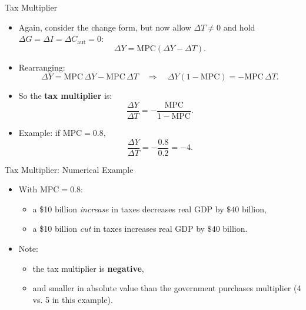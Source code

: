 \documentclass[aspectratio=169]{beamer}
\begin{document}
\begin{frame}{Tax Multiplier}
\transfade
\begin{itemize}[<+->]
  \item Again, consider the change form, but now allow \(\Delta T \neq 0\) and hold \(\Delta G = \Delta I = \Delta C_{\text{aut}} = 0\):
  \[
    \Delta Y = \text{MPC} (\Delta Y - \Delta T).
  \]
  \item Rearranging:
  \[
    \Delta Y = \text{MPC} \,\Delta Y - \text{MPC} \,\Delta T
    \quad \Rightarrow \quad
    \Delta Y (1 - \text{MPC}) = - \text{MPC} \,\Delta T.
  \]
  \item So the \textbf{tax multiplier} is:
  \[
    \frac{\Delta Y}{\Delta T} = - \frac{\text{MPC}}{1 - \text{MPC}}.
  \]
  \item Example: if \(\text{MPC} = 0.8\),
  \[
    \frac{\Delta Y}{\Delta T} = -\frac{0.8}{0.2} = -4.
  \]
\end{itemize}
\end{frame}

\begin{frame}{Tax Multiplier: Numerical Example}
\transfade
\begin{itemize}[<+->]
  \item With \(\text{MPC} = 0.8\):
  \begin{itemize}[<+->]
    \item a \$10 billion \emph{increase} in taxes decreases real GDP by \(\$40\) billion,
    \item a \$10 billion \emph{cut} in taxes increases real GDP by \(\$40\) billion.
  \end{itemize}
  \item Note:
  \begin{itemize}[<+->]
    \item the tax multiplier is \textbf{negative},
    \item and smaller in absolute value than the government purchases multiplier
          (4 vs. 5 in this example).
  \end{itemize}
\end{itemize}
\end{frame}
\end{document}
